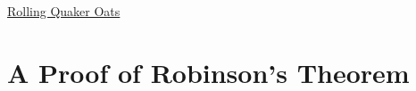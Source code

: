 \documentclass{ximera}
\begin{document}
\begin{enumerate}
\begin{onlineOnly}
    \begin{center}
\end{center}
\end{onlineOnly}

\href{https://www.desmos.com/calculator/7miak40vna}{Rolling Quaker Oats}


\end{enumerate}


\section{A Proof of Robinson's Theorem}
\end{document}
